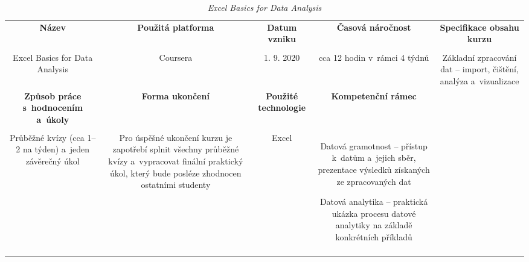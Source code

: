 \begin{landscape}

\begin{table}[htbp]

\renewcommand\thetable{7}

\caption{\textit{Excel Basics for Data Analysis}}\label{tab7}

\footnotesize

{

\justifying

\begin{tabularx}{\linewidth}{CCCCC}

\toprule

\textbf{Název} &

\textbf{Použitá platforma} &

\textbf{Datum vzniku} &

\textbf{Časová náročnost} &
 
\textbf{Specifikace obsahu kurzu}

\\

\tabularnewline
\midrule

Excel Basics for Data Analysis

&

Coursera

&

1. 9. 2020

&

cca 12 hodin v~rámci 4 týdnů

&

Základní zpracování dat – import, čištění, analýza a~vizualizace

\\
\toprule

\textbf{Způsob práce s~hodnocením a~úkoly} &

\textbf{Forma ukončení} &

\textbf{Použité technologie} &

\textbf{Kompetenční rámec} 

\\

\tabularnewline
\midrule

Průběžné kvízy (cca 1–2 na týden) a~jeden závěrečný úkol    

&

Pro úspěšné ukončení kurzu je zapotřebí splnit všechny průběžné kvízy a~vypracovat finální praktický úkol, který bude posléze zhodnocen ostatními studenty

&

Excel

&

Datová gramotnost – přístup k~datům a~jejich sběr, prezentace výsledků získaných ze zpracovaných dat

Datová analytika – praktická ukázka procesu datové analytiky na základě konkrétních příkladů   

\\

\tabularnewline
\bottomrule
\end{tabularx}

}

\end{table}

\end{landscape}